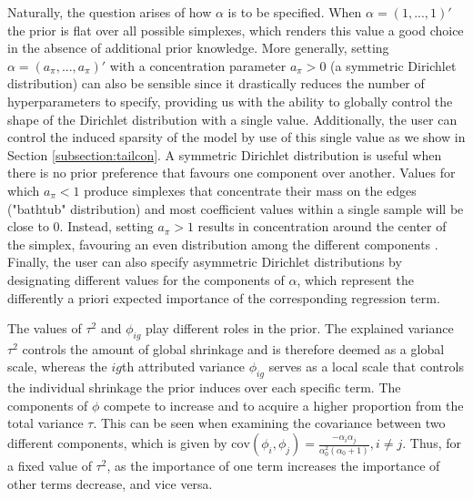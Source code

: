 Naturally, the question arises of how $\alpha$ is to be specified. When $\alpha=(1,...,1)'$ the prior is flat over all possible simplexes, which renders this value a good choice in the absence of additional prior knowledge. More generally, setting $\alpha=(a_\pi,...,a_\pi)'$ with a concentration parameter $a_\pi > 0$ (a symmetric Dirichlet distribution) can also be sensible since it drastically reduces the number of hyperparameters to specify, providing us with the ability to globally control the shape of the Dirichlet distribution with a single value. Additionally, the user can control the induced sparsity of the model by use of this single value as we show in Section \ref{subsection:tailcon}. A symmetric Dirichlet distribution is useful when there is no prior preference that favours one component over another. Values for which $a_\pi<1$ produce simplexes that concentrate their mass on the edges ("bathtub" distribution) and most coefficient values within a single sample will be close to 0. Instead, setting $a_\pi>1$ results in concentration around the center of the simplex, favouring an even distribution among the different components \citep{OnTheDirichlet}. Finally, the user can also specify asymmetric Dirichlet distributions by designating different values for the components of $\alpha$, which represent the differently a priori expected importance of the corresponding regression term.

The values of $\tau^2$ and $\phi_{ig}$ play different roles in the prior. The explained variance $\tau^2$ controls the amount of global shrinkage and is therefore deemed as a global scale, whereas the $ig$th attributed variance $\phi_{ig}$ serves as a local scale that controls the individual shrinkage the prior induces over each specific term. The components of $\phi$ compete to increase and to acquire a higher proportion from the total variance $\tau$. This can be seen when examining the covariance between two different components, which is given by $\text{cov}(\phi_i, \phi_j)= \frac{-\alpha_i \alpha_j}{ \alpha_0^2 (\alpha_0+1)}, i\neq j$. Thus, for a fixed value of $\tau^2$, as the importance of one term increases the importance of other terms decrease, and vice versa.


